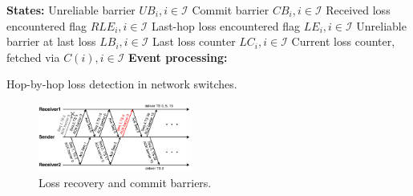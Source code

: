 \setlength{\textfloatsep}{1em}
\begin{algorithm}[t]
 \DontPrintSemicolon
 \textbf{States:} Unreliable barrier $UB_i, i \in \mathcal{I}$\;
 	\qquad Commit barrier $CB_i, i \in \mathcal{I}$\;
    \qquad Received loss encountered flag $RLE_i, i \in \mathcal{I}$\;
 	\qquad Last-hop loss encountered flag $LE_i, i \in \mathcal{I}$\;
    \qquad Unreliable barrier at last loss $LB_i, i \in \mathcal{I}$\;
    \qquad Last loss counter $LC_i, i \in \mathcal{I}$\;
    \qquad Current loss counter, fetched via $C(i), i \in \mathcal{I}$\;
 \textbf{Event processing:}\\
 \caption{Hop-by-hop loss detection in network switches.}
 \label{alg:loss-detection}
\end{algorithm}



\begin{figure}[t]
\centering
\includegraphics[width=0.45\textwidth]{images/loss_detection.pdf}
\caption{Loss recovery and commit barriers.}
\label{fig:ack-barrier}
\vspace{-0.4em}
\end{figure}



